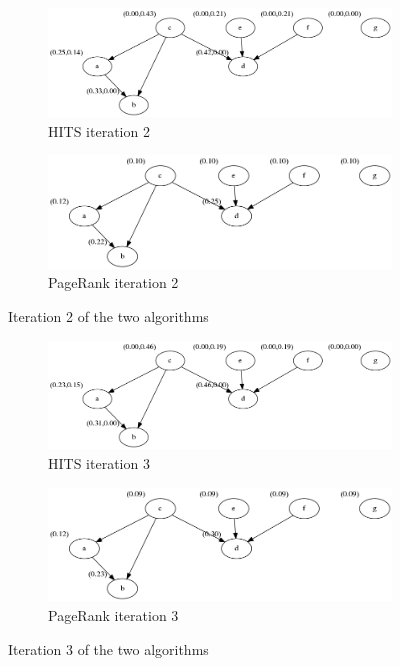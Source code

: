\documentclass{article}
\begin{document}
	\begin{figure}[]
	\centering
	\begin{subfigure}{.5\textwidth}
	  \centering
	  \includegraphics[width=\linewidth]{HITS_it2.png}
	  \caption{HITS iteration 2}
	  \label{}
	\end{subfigure}%
	\begin{subfigure}{.5\textwidth}
	  \centering
	  \includegraphics[width=\linewidth]{PR_graph_iter_2.png}
	  \caption{PageRank iteration 2}
	  \label{}
	\end{subfigure}
	\caption{Iteration 2 of the two algorithms}
	\label{fig:PR_HITS_it2}
	\end{figure}
	\begin{figure}[]
		\centering
		\begin{subfigure}{.5\textwidth}
		  \centering
		  \includegraphics[width=\linewidth]{HITS_it3.png}
		  \caption{HITS iteration 3}
		  \label{}
		\end{subfigure}%
		\begin{subfigure}{.5\textwidth}
		  \centering
		  \includegraphics[width=\linewidth]{PR_graph_iter_3.png}
		  \caption{PageRank iteration 3}
		  \label{}
		\end{subfigure}
		\caption{Iteration 3 of the two algorithms}
		\label{fig:PR_HITS_it3}
	\end{figure}
\end{document}
